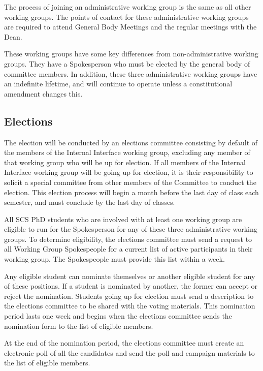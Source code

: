\documentclass{article}
\begin{document}
The process of joining an administrative working group is the same as all other working groups. The points of contact for these administrative working groups are required to attend General Body Meetings and the regular meetings with the Dean.

These working groups have some key differences from non-administrative working groups. They have a Spokesperson who must be elected by the general body of committee members. In addition, these three administrative working groups have an indefinite lifetime, and will continue to operate unless a constitutional amendment changes this. 

\subsection{Elections}\label{sec:elections}

The election will be conducted by an elections committee consisting by default of the members of the Internal Interface working group, excluding any member of that working group who will be up for election. If all members of the Internal Interface working group will be going up for election, it is their responsibility to solicit a special committee from other members of the Committee to conduct the election. This election process will begin a month before the last day of class each semester, and must conclude by the last day of classes.

All SCS PhD students who are involved with at least one working group are eligible to run for the Spokesperson for any of these three administrative working groups. To determine eligibility, the elections committee must send a request to all Working Group Spokespeople for a current list of active participants in their working group. The Spokespeople must provide this list within a week.

Any eligible student can nominate themselves or another eligible student for any of these positions. If a student is nominated by another, the former can accept or reject the nomination. Students going up for election must send a description to the elections committee to be shared with the voting materials. This nomination period lasts one week and begins when the elections committee sends the nomination form to the list of eligible members. 


At the end of the nomination period, the elections committee must create an electronic poll of all the candidates and send the poll and campaign materials to the list of eligible members.
\end{document}
